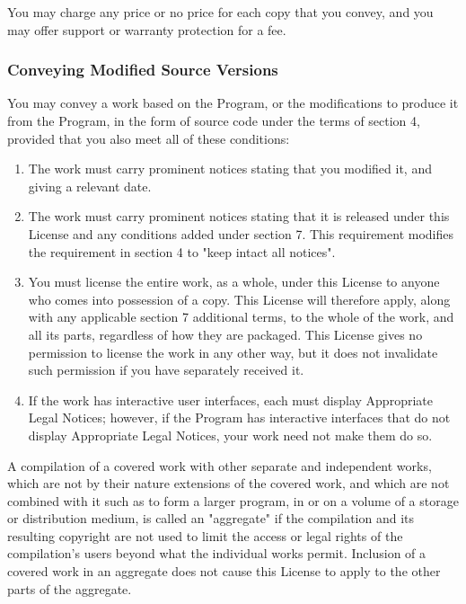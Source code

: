 \documentclass{ctexart}
\begin{document}
  You may charge any price or no price for each copy that you convey,
and you may offer support or warranty protection for a fee.

\subsubsection{Conveying Modified Source Versions}

  You may convey a work based on the Program, or the modifications to
produce it from the Program, in the form of source code under the
terms of section 4, provided that you also meet all of these conditions:
\begin{enumerate}
\renewcommand\theenumiP{\roman{enumi}}
  \item  The work must carry prominent notices stating that you modified
    it, and giving a relevant date.
  \item  The work must carry prominent notices stating that it is
    released under this License and any conditions added under section
    7.  This requirement modifies the requirement in section 4 to
    "keep intact all notices".
  \item You must license the entire work, as a whole, under this
    License to anyone who comes into possession of a copy.  This
    License will therefore apply, along with any applicable section 7
    additional terms, to the whole of the work, and all its parts,
    regardless of how they are packaged.  This License gives no
    permission to license the work in any other way, but it does not
    invalidate such permission if you have separately received it.
  \item  If the work has interactive user interfaces, each must display
    Appropriate Legal Notices; however, if the Program has interactive
    interfaces that do not display Appropriate Legal Notices, your
    work need not make them do so.
\end{enumerate}

  A compilation of a covered work with other separate and independent
works, which are not by their nature extensions of the covered work,
and which are not combined with it such as to form a larger program,
in or on a volume of a storage or distribution medium, is called an
"aggregate" if the compilation and its resulting copyright are not
used to limit the access or legal rights of the compilation's users
beyond what the individual works permit.  Inclusion of a covered work
in an aggregate does not cause this License to apply to the other
parts of the aggregate.
\end{document}
